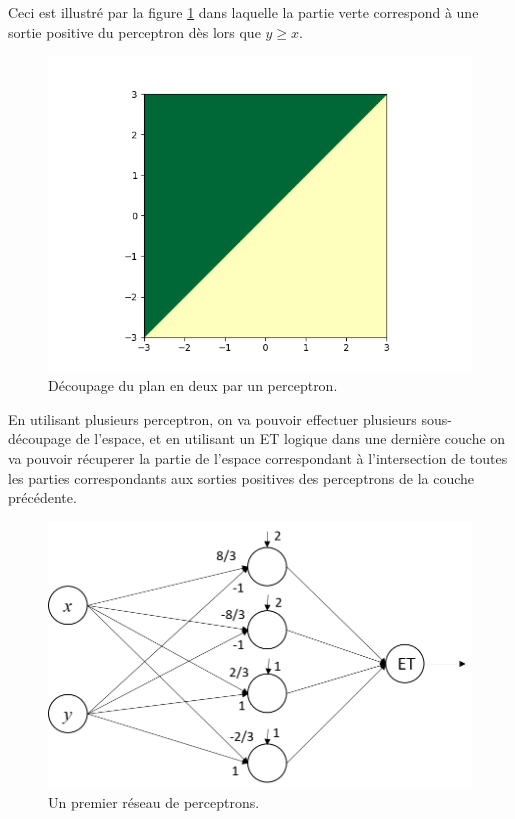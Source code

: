 Ceci est illustré par la figure \ref{fig:perceptron-example1} dans laquelle la 
partie verte correspond à une sortie positive du perceptron dès lors que $y \geq x$.

\begin{figure}[h]
  \centering
  \includegraphics[scale=0.5]{assets/perceptron-example1}
  \caption{Découpage du plan en deux par un perceptron.}
  \label{fig:perceptron-example1}
\end{figure}


En utilisant plusieurs perceptron, on va pouvoir effectuer plusieurs sous-découpage 
de l'espace, et en utilisant un ET logique dans une dernière couche 
on va pouvoir récuperer la partie de l'espace 
correspondant à l'intersection de toutes les parties correspondants aux sorties 
positives des perceptrons de la couche précédente.

\begin{figure}[h]
  \centering
  \includegraphics[scale=0.5]{assets/perceptron-network-example2}
  \caption{Un premier réseau de perceptrons.}
  \label{fig:perceptron-network-example2}
\end{figure}

